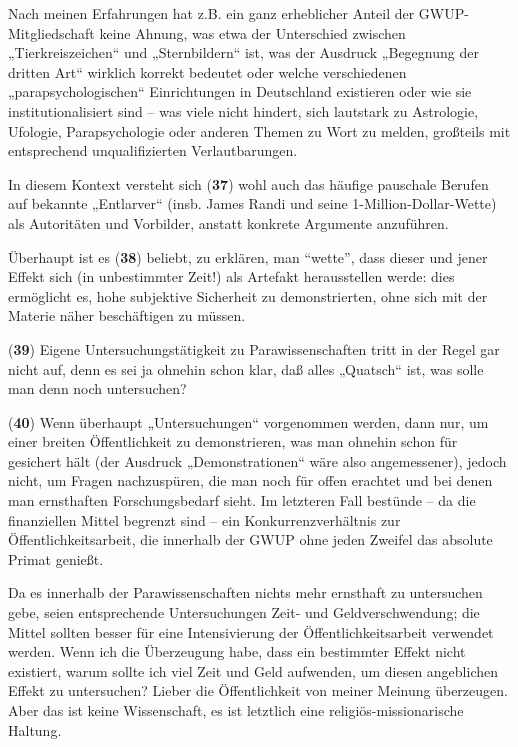 Nach meinen Erfahrungen hat z.B. ein ganz erheblicher Anteil der
GWUP-Mitgliedschaft keine Ahnung, was etwa der Unterschied zwischen
„Tierkreiszeichen`` und „Sternbildern`` ist, was der Ausdruck „Begegnung
der dritten Art`` wirklich korrekt bedeutet oder welche verschiedenen
„parapsychologischen`` Einrichtungen in Deutschland existieren oder wie
sie institutionalisiert sind -- was viele nicht hindert, sich lautstark
zu Astrologie, Ufologie, Parapsychologie oder anderen Themen zu Wort zu
melden, großteils mit entsprechend unqualifizierten Verlautbarungen.

In diesem Kontext versteht sich (\textbf{37}) wohl auch das häufige
pauschale Berufen auf bekannte „Entlarver`` (insb. James Randi und seine
1-Million-Dollar-Wette) als Autoritäten und Vorbilder, anstatt konkrete
Argumente anzuführen.

Überhaupt ist es (\textbf{38}) beliebt, zu erklären, man ``wette'', dass
dieser und jener Effekt sich (in unbestimmter Zeit!) als Artefakt
herausstellen werde: dies ermöglicht es, hohe subjektive Sicherheit zu
demonstrierten, ohne sich mit der Materie näher beschäftigen zu müssen.

(\textbf{39}) Eigene Untersuchungstätigkeit zu Parawissenschaften tritt
in der Regel gar nicht auf, denn es sei ja ohnehin schon klar, daß alles
„Quatsch`` ist, was solle man denn noch untersuchen?

(\textbf{40}) Wenn überhaupt „Untersuchungen`` vorgenommen werden, dann
nur, um einer breiten Öffentlichkeit zu demonstrieren, was man ohnehin
schon für gesichert hält (der Ausdruck „Demonstrationen`` wäre also
angemessener), jedoch nicht, um Fragen nachzuspüren, die man noch für
offen erachtet und bei denen man ernsthaften Forschungsbedarf sieht. Im
letzteren Fall bestünde -- da die finanziellen Mittel begrenzt sind --
ein Konkurrenzverhältnis zur Öffentlichkeitsarbeit, die innerhalb der
GWUP ohne jeden Zweifel das absolute Primat genießt.

Da es innerhalb der Parawissenschaften nichts mehr ernsthaft zu
untersuchen gebe, seien entsprechende Untersuchungen Zeit- und
Geldverschwendung; die Mittel sollten besser für eine Intensivierung der
Öffentlichkeitsarbeit verwendet werden. Wenn ich die Überzeugung habe,
dass ein bestimmter Effekt nicht existiert, warum sollte ich viel Zeit
und Geld aufwenden, um diesen angeblichen Effekt zu untersuchen? Lieber
die Öffentlichkeit von meiner Meinung überzeugen. Aber das ist keine
Wissenschaft, es ist letztlich eine religiös-missionarische Haltung.

